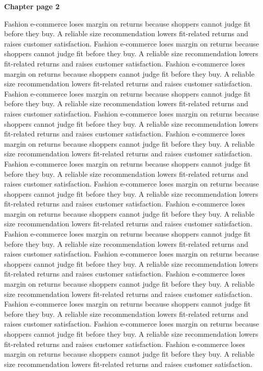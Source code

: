 \documentclass[a4paper,11pt]{article}
\begin{document}
{\headfont\bfseries\Large Chapter page 2}\par\medskip
Fashion e-commerce loses margin on returns because shoppers cannot judge fit before they buy. A reliable size recommendation lowers fit-related returns and raises customer satisfaction. Fashion e-commerce loses margin on returns because shoppers cannot judge fit before they buy. A reliable size recommendation lowers fit-related returns and raises customer satisfaction. Fashion e-commerce loses margin on returns because shoppers cannot judge fit before they buy. A reliable size recommendation lowers fit-related returns and raises customer satisfaction. Fashion e-commerce loses margin on returns because shoppers cannot judge fit before they buy. A reliable size recommendation lowers fit-related returns and raises customer satisfaction. Fashion e-commerce loses margin on returns because shoppers cannot judge fit before they buy. A reliable size recommendation lowers fit-related returns and raises customer satisfaction. 
Fashion e-commerce loses margin on returns because shoppers cannot judge fit before they buy. A reliable size recommendation lowers fit-related returns and raises customer satisfaction. Fashion e-commerce loses margin on returns because shoppers cannot judge fit before they buy. A reliable size recommendation lowers fit-related returns and raises customer satisfaction. Fashion e-commerce loses margin on returns because shoppers cannot judge fit before they buy. A reliable size recommendation lowers fit-related returns and raises customer satisfaction. Fashion e-commerce loses margin on returns because shoppers cannot judge fit before they buy. A reliable size recommendation lowers fit-related returns and raises customer satisfaction. Fashion e-commerce loses margin on returns because shoppers cannot judge fit before they buy. A reliable size recommendation lowers fit-related returns and raises customer satisfaction. 
Fashion e-commerce loses margin on returns because shoppers cannot judge fit before they buy. A reliable size recommendation lowers fit-related returns and raises customer satisfaction. Fashion e-commerce loses margin on returns because shoppers cannot judge fit before they buy. A reliable size recommendation lowers fit-related returns and raises customer satisfaction. Fashion e-commerce loses margin on returns because shoppers cannot judge fit before they buy. A reliable size recommendation lowers fit-related returns and raises customer satisfaction. Fashion e-commerce loses margin on returns because shoppers cannot judge fit before they buy. A reliable size recommendation lowers fit-related returns and raises customer satisfaction. Fashion e-commerce loses margin on returns because shoppers cannot judge fit before they buy. A reliable size recommendation lowers fit-related returns and raises customer satisfaction. \newpage
\end{document}
